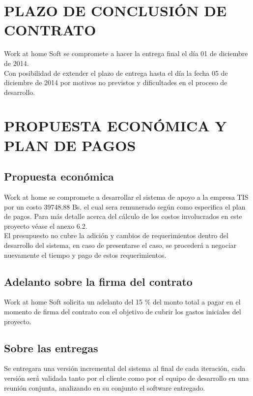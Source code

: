 \documentclass[11pt,letterpaper]{report}
\begin{document}
\chapter{PLAZO DE CONCLUSIÓN DE CONTRATO}
Work at home Soft se compromete a hacer la entrega final el día 01 de diciembre de 2014.\\
Con posibilidad de extender el plazo de entrega hasta el día la fecha 05 de diciembre de 2014 por motivos no previstos y dificultades en el proceso de desarrollo.

\chapter{PROPUESTA ECONÓMICA Y PLAN DE PAGOS}

\section{Propuesta económica}

Work at home se compromete a desarrollar el sistema de apoyo a la empresa TIS por un costo 39748.88 Bs. el cual sera remunerado según como especifica el plan de pagos.
Para más detalle acerca del cálculo de los costos involucrados en este proyecto véase el anexo 6.2.\\
El presupuesto no cubre la adición y cambios de requerimientos dentro del desarrollo del sistema, en caso de presentarse el caso, se procederá a  negociar nuevamente el tiempo y pago de estos requerimientos.

\section{Adelanto sobre la firma del contrato}

Work at home Soft solicita un adelanto del 15 \% del monto total a pagar en el momento de firma del contrato con el objetivo de cubrir los gastos iniciales del proyecto.

\section{Sobre las entregas}
Se entregara una versión incremental del sistema al final de cada iteración, cada versión será validada tanto por el cliente como por el equipo de desarrollo en una reunión conjunta, analizando en su conjunto el software entregado.
\end{document}
